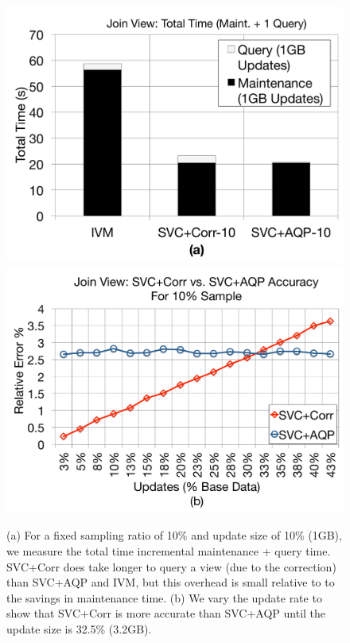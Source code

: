 \begin{figure}[t]
\centering
 \includegraphics[scale=0.13]{exp/msj_4.pdf}
 \includegraphics[scale=0.13]{exp/msj_6.pdf}\vspace{-.5em}
  \caption{(a) For a fixed sampling ratio of 10\% and update size of 10\% (1GB), we measure the total time incremental maintenance + query time. SVC+Corr does take longer to query a view (due to the correction) than SVC+AQP and IVM, but this overhead is small relative to to the savings in maintenance time. (b) We vary the update rate to show that SVC+Corr is more accurate than SVC+AQP until the update size is 32.5\% (3.2GB). \vspace{-1em} \label{exp-1-total}}
\end{figure}

